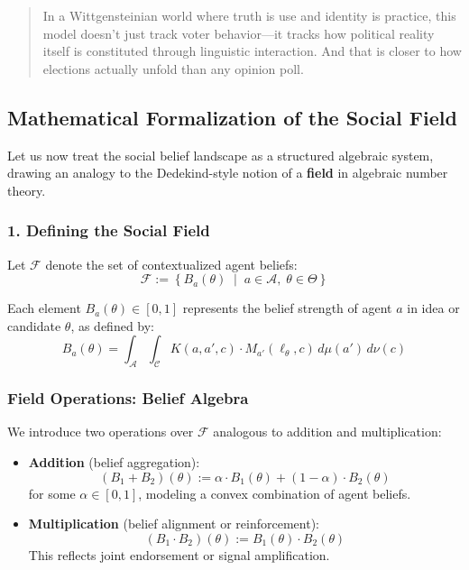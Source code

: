 \begin{quote}
In a Wittgensteinian world where truth is use and identity is practice, this model doesn’t just track voter behavior—it tracks how political reality itself is constituted through linguistic interaction. And that is closer to how elections actually unfold than any opinion poll.
\end{quote}

\subsection{Mathematical Formalization of the Social Field}

Let us now treat the social belief landscape as a structured algebraic system, drawing an analogy to the Dedekind-style notion of a \textbf{field} in algebraic number theory.

\subsubsection{1. Defining the Social Field}

Let \( \mathcal{F} \) denote the set of contextualized agent beliefs:
\[
\mathcal{F} := \left\{ B_a(\theta) \;\middle|\; a \in \mathcal{A},\; \theta \in \Theta \right\}
\]

Each element \( B_a(\theta) \in [0,1] \) represents the belief strength of agent \( a \) in idea or candidate \( \theta \), as defined by:
\[
B_a(\theta) = \int_{\mathcal{A}} \int_{\mathcal{C}} K(a, a', c) \cdot M_{a'}(\ell_\theta, c) \, d\mu(a') \, d\nu(c)
\]

\subsubsection{Field Operations: Belief Algebra}

We introduce two operations over \( \mathcal{F} \) analogous to addition and multiplication:

\begin{itemize}
    \item \textbf{Addition} (belief aggregation):
    \[
    (B_1 + B_2)(\theta) := \alpha \cdot B_1(\theta) + (1 - \alpha) \cdot B_2(\theta)
    \]
    for some \( \alpha \in [0,1] \), modeling a convex combination of agent beliefs.

    \item \textbf{Multiplication} (belief alignment or reinforcement):
    \[
    (B_1 \cdot B_2)(\theta) := B_1(\theta) \cdot B_2(\theta)
    \]
    This reflects joint endorsement or signal amplification.
\end{itemize}

